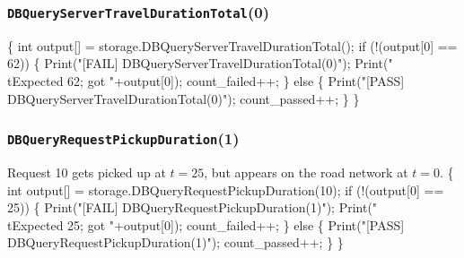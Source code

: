 \documentclass{article}
\def\nwendcode{\endtrivlist \endgroup}
\let\nwdocspar=\par
\begin{document}
\subsubsection{{\tt{}DBQueryServerTravelDurationTotal}(0)}
\nwenddocs{}\endmoddef{}
\{
  int output[] = storage.DBQueryServerTravelDurationTotal();
  if (!(output[0] == 62)) \{
    Print("[FAIL] DBQueryServerTravelDurationTotal(0)");
    Print("\\tExpected 62; got "+output[0]);
    count_failed++;
  \} else \{
    Print("[PASS] DBQueryServerTravelDurationTotal(0)");
    count_passed++;
  \}
\}
\nwendcode{}\nwdocspar
\subsubsection{{\tt{}DBQueryRequestPickupDuration}(1)}
Request 10 gets picked up at $t=25$, but appears on the road network at $t=0$.
\nwenddocs{}\endmoddef{}
\{
  int output[] = storage.DBQueryRequestPickupDuration(10);
  if (!(output[0] == 25)) \{
    Print("[FAIL] DBQueryRequestPickupDuration(1)");
    Print("\\tExpected 25; got "+output[0]);
    count_failed++;
  \} else \{
    Print("[PASS] DBQueryRequestPickupDuration(1)");
    count_passed++;
  \}
\}
\nwendcode{}\nwdocspar
\end{document}
